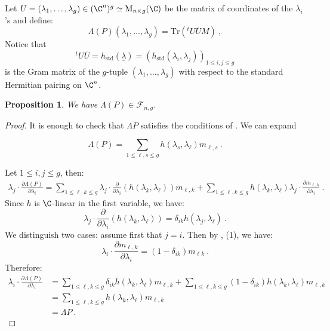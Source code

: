 \documentclass[11pt,letterpaper,english]{amsart}
\numberwithin{equation}{subsection}
\numberwithin{equation}{section}
\newcommand\cF{{\mathcal F}}
\newcommand{\trace}{\mathrm{Tr}}
\theoremstyle{plain}
\newtheorem{proposition}[theorem]{Proposition}
\theoremstyle{remark}
\begin{document}
Let $U=(\lambda_1,\ldots,\lambda_g)\in(\C^n)^g\simeq \mathrm{M}_{n\times g}(\C)$  be the matrix of coordinates of the $\lambda _i$'s and define:
\[\Lambda (P)(\lambda_1,\ldots,\lambda_g)=\trace\left({^t{U}}\overline{U}M\right) ~,\]
Notice that \[{^tU}\overline U={h_{\mathrm{std}}}(\underline \lambda)=(h_{\mathrm{std}}(\lambda_i,\lambda_j))_{1\leq i,j\leq g}\] is the Gram matrix of the $g$-tuple $(\lambda_1,\dots,\lambda_g)$ with respect to the standard Hermitian pairing on $\C^n$. 
\begin{proposition}\label{p:belonging}
    We have $\Lambda (P)\in \cF_{n,g}$.
\end{proposition}
\begin{proof}
It is enough to check that $\Lambda P$ satisfies the conditions of  . We can expand 

\[\Lambda(P)=\sum_{1\leq \ell,s\leq g}h(\lambda_s,\lambda_\ell)m_{\ell,s}~.\]

Let $1\leq i,j\leq g$, then:
\begin{align*}
    \lambda_j\cdot\frac{\partial \Lambda(P)}{\partial \lambda_i}=\sum_{1\leq \ell,k\leq g} \lambda_j\cdot\frac{\partial}{\partial \lambda_i}\left(h(\lambda_k,\lambda_\ell)\right)m_{\ell,k}+\sum_{1\leq \ell,k\leq g} h(\lambda_k,\lambda_\ell)\lambda_j\cdot\frac{\partial m_{\ell,k}}{\partial \lambda_i}~.
\end{align*}
Since $h$ is $\C$-linear in the first variable, we have: \[\lambda_j\cdot\frac{\partial}{\partial\lambda_i}(h(\lambda_k,\lambda_\ell))=\delta_{ik}h(\lambda_j,\lambda_\ell)~.\]
We distinguish two cases: assume first that $j=i$. Then by , (1), we have:
\[\lambda_i\cdot\frac{\partial m_{\ell,k}}{\partial\lambda_i}=(1-\delta_{i k})m_{\ell k}~.\]
Therefore: 
\begin{align*}
    \lambda_i\cdot\frac{\partial \Lambda(P)}{\partial \lambda_i}&=\sum_{1\leq \ell,k\leq g} \delta_{ik}h(\lambda_k,\lambda_\ell)m_{\ell,k}+\sum_{1\leq \ell,k\leq g}(1-\delta_{ik}) h(\lambda_k,\lambda_\ell)m_{\ell,k}\\
    &=\sum_{1\leq \ell,k\leq g} h(\lambda_k,\lambda_\ell)m_{\ell,k}\\
    &= \Lambda P~.
\end{align*}


\end{proof}
\end{document}
